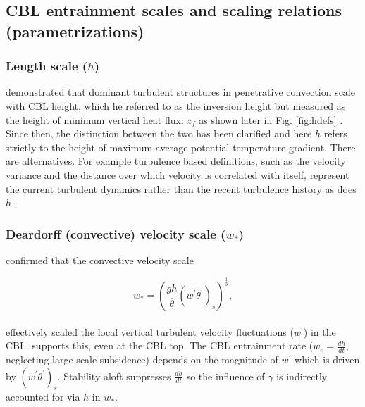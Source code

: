 \subsection{CBL entrainment scales and scaling relations (parametrizations)}
\label{subsec:scales}
\subsubsection{Length scale ($h$)}
\label{subsubsec:}

\cite{Deardorff72} demonstrated that dominant turbulent structures in penetrative convection scale with CBL height, which he referred to as the inversion height but measured as the height of minimum vertical heat flux: $z_{f}$ as shown later in Fig. \ref{fig:hdefs} \citep{DearWill80}.  Since then, the distinction between the two has been clarified \citep{SullMoengStev} and here $h$ refers strictly to the height of maximum average potential temperature gradient. There are alternatives. For example turbulence based definitions, such as the velocity variance and the distance over which velocity is correlated with itself, represent the current turbulent dynamics rather than the recent turbulence history as does $h$ \citep{Traum11}.\\

\subsubsection{Deardorff (convective) velocity scale ($w_{*}$)}
\label{subsubsec:convel}

\cite{Deardorff70} confirmed that the convective velocity scale

\begin{equation}
w_{*} = \left( \frac{gh}{\overline{\theta}}(\overline{w^{'}\theta^{'}})_{s} \right)^{\frac{1}{3}},
\end{equation}\\


 effectively scaled the local vertical turbulent velocity fluctuations ($w^{'}$) in the CBL.  \cite{Sorbjan1} supports this, even at the CBL top.  The CBL entrainment rate ($w_{e} = \frac{dh}{dt}$, neglecting large scale subsidence) depends on the magnitude of $w^{'}$ which is driven by $(\overline{w^{'}\theta^{'}})_{s}$. Stability aloft suppresses $\frac{dh}{dt}$ so the influence of $\gamma$ is indirectly accounted for via $h$ in $w_{*}$.\\

